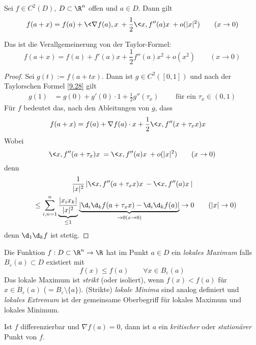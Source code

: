 \documentclass[a4paper,10pt]{scrbook}
\begin{document}
\begin{thm}
Sei $f\in C^2(D)$, $D\subset \R^n$ offen und $a\in D$.
Dann gilt
\[
f(a+x)=f(a)+\<\nabla f(a), x\> + \frac 12 \<x,f''(a) x\> + o(|x|^2) \qquad (x\to 0)
\]
\begin{note}
Das ist die Verallgemeinerung von der Taylor-Formel:
\[
f(a+x) = f(a) + f'(a)x + \frac 12 f''(a)x^2 + o(x^2) \qquad (x\to 0)
\]
\end{note}

\begin{proof}
Sei $g(t):= f(a+tx)$. 
Dann ist $g \in C^2([0,1])$ und nach der Taylorschen Formel \ref{9.28} gilt
\begin{align*}
g(1) &= g(0) + g'(0)\cdot 1 + \frac 12 g''(\tau_x) \qquad \text{ für ein } \tau_x\in (0,1)
\end{align*}
Für $f$ bedeutet das, nach den Ableitungen von $g$, dass
\begin{align*}
f(a+x) &= f(a) + \nabla f(a)\cdot x + \frac 12 \<x,f''(x+\tau_x x)x\>
\end{align*}
Wobei
\[
	\<x,f''(a+\tau_x)x\> = \<x,f''(a)x\> + o(|x|^2) \qquad (x\to 0)
\]
denn
\begin{multline*}
\frac 1{|x|^2}\left|\<x,f''(a+\tau_x x)x\>-\<x,f''(a)x\>\right|\\
\quad \le \sum_{i,n=1}^n\underbrace{\frac {|x_ix_k|}{|x|^2}}_{\le 1}\underbrace{\left|\d_i\d_kf(a+\tau_x x)-\d_i\d_kf(a)\right|}_{\to 0 (x\to 0)} \to 0 \qquad (|x|\to 0)
\end{multline*}
denn $\d_1\d_kf$ ist stetig.
\end{proof}
\end{thm}

\begin{df}
Die Funktion $f:D\subset \R^n\to \R$ hat im Punkt $a\in D$ ein \emph{lokales Maximum} falls $B_\varepsilon(a)\subset D$ existiert mit
\[
f(x)\le f(a) \qquad \forall x\in B_\varepsilon(a)
\]
Das lokale Maximum ist \emph{strikt} (oder isoliert), wenn $f(x)<f(a)$ für $x\in \dot B_\varepsilon(a)$ ($=B_\varepsilon \setminus \{a\})$.
(Strikte) \emph{lokale Minima} sind analog definiert und \emph{lokales Extremum} ist der gemeinsame Oberbegriff für lokales Maximum und lokales Minimum.

Ist $f$ differenzierbar und $\nabla f(a)=0$, dann ist $a$ ein \emph{kritischer} oder \emph{stationärer} Punkt von $f$.
\end{df}
\end{document}
